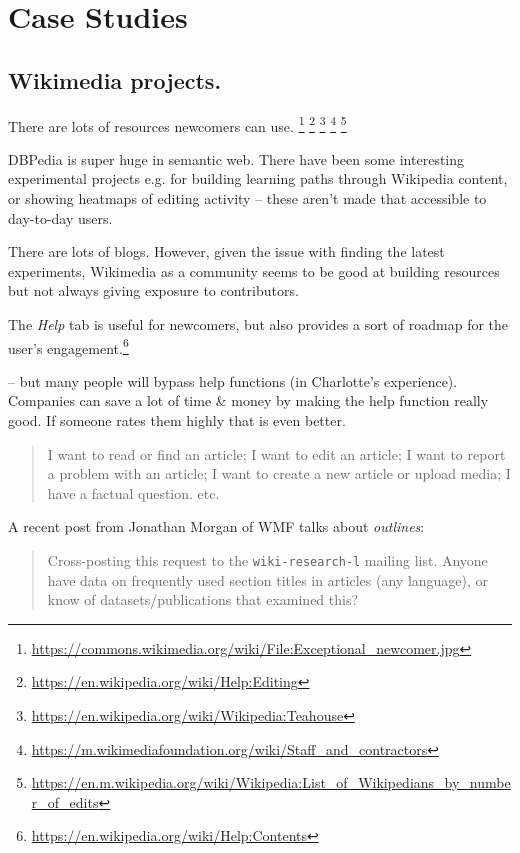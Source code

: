 \section{Case Studies}\label{sec:Case Studies}

\subsection{Wikimedia projects.}

 There are lots of resources newcomers can use.
\footnote{\url{https://commons.wikimedia.org/wiki/File:Exceptional_newcomer.jpg}}
\footnote{\url{https://en.wikipedia.org/wiki/Help:Editing}}
\footnote{\url{https://en.wikipedia.org/wiki/Wikipedia:Teahouse}}
\footnote{\url{https://m.wikimediafoundation.org/wiki/Staff_and_contractors}}
\footnote{\url{https://en.m.wikipedia.org/wiki/Wikipedia:List_of_Wikipedians_by_number_of_edits}}

 DBPedia is super huge in semantic
web.  There have been some interesting experimental projects e.g. for
building learning paths through Wikipedia content, or showing heatmaps
of editing activity -- these aren't made that accessible to day-to-day
users.

 There are lots of blogs.  However, given the
issue with finding the latest experiments, Wikimedia as a community
seems to be good at building resources but not always giving exposure
to contributors.

 The \emph{Help} tab is useful for newcomers, but
also provides a sort of roadmap for the user's
engagement.\footnote{\url{https://en.wikipedia.org/wiki/Help:Contents}}

-- but many people will bypass help functions (in Charlotte's
experience).  Companies can save a lot of time \& money by making the
help function really good.  If someone rates them highly that is even
better.

\begin{quotation}
\noindent 
I want to read or find an article;
I want to edit an article;
I want to report a problem with an article;
I want to create a new article or upload media;
I have a factual question.
etc.
\end{quotation}

A recent post from Jonathan Morgan of WMF talks about \emph{outlines}: 

\begin{quotation}
\noindent Cross-posting this request to the {\tt wiki-research-l} mailing
list. Anyone have data on frequently used section titles in articles
(any language), or know of datasets/publications that examined this?
\end{quotation}

